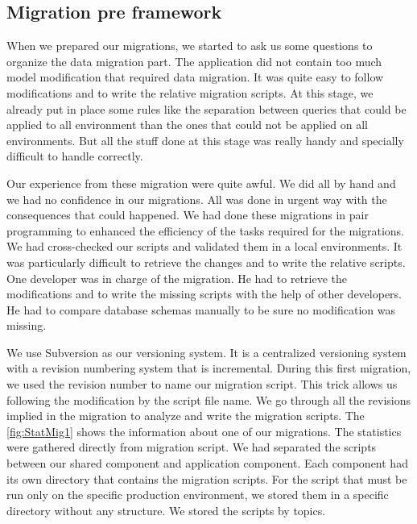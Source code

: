 \subsection{Migration pre framework}

When we prepared our migrations, we started to ask us some questions to organize the data migration part. The application did not contain too much model modification that required data migration. It was quite easy to follow modifications and to write the relative migration scripts. At this stage, we already put in place some rules like the separation between queries that could be applied to all environment than the ones that could not be applied on all environments. But all the stuff done at this stage was really handy and specially difficult to handle correctly.

Our experience from these migration were quite awful. We did all by hand and we had no confidence in our migrations. All was done in urgent way with the consequences that could happened. We had done these migrations in pair programming to enhanced the efficiency of the tasks required for the migrations. We had cross-checked our scripts and validated them in a local environments. It was particularly difficult to retrieve the changes and to write the relative scripts. One developer was in charge of the migration. He had to retrieve the modifications and to write the missing scripts with the help of other developers. He had to compare database schemas manually to be sure no modification was missing.

We use Subversion\cite{subversion} as our versioning system. It is a centralized versioning system with a revision numbering system that is incremental. During this first migration, we used the revision number to name our migration script. This trick allows us following the modification by the script file name. We go through all the revisions implied in the migration to analyze and write the migration scripts. The \autoref{fig:StatMig1} shows the information about one of our migrations. The statistics were gathered directly from migration script. We had separated the scripts between our shared component and application component. Each component had its own directory that contains the migration scripts. For the script that must be run only on the specific production environment, we stored them in a specific directory without any structure. We stored the scripts by topics.

